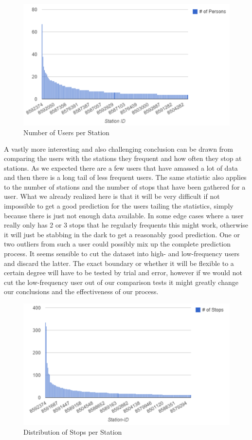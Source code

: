 \begin{figure}[!ht]
	\caption{Number of Users per Station}
	\centering
	\includegraphics[width=1.0\textwidth]{charts/persons_per_station}
\end{figure}

A vastly more interesting and also challenging conclusion can be drawn from comparing the users with the stations they frequent and how often they stop at stations. As we expected there are a few users that have amassed a lot of data and then there is a long tail of less frequent users. The same statistic also applies to the number of stations and the number of stops that have been gathered for a user. What we already realized here is that it will be very difficult if not impossible to get a good prediction for the users tailing the statistics, simply because there is just not enough data available. In some edge cases where a user really only has 2 or 3 stops that he regularly frequents this might work, otherwise it will just be stabbing in the dark to get a reasonably good prediction. One or two outliers from such a user could possibly mix up the complete prediction process. It seems sensible to cut the dataset into high- and low-frequency users and discard the latter. The exact boundary or whether it will be flexible to a certain degree will have to be tested by trial and error, however if we would not cut the low-frequency user out of our comparison tests it might greatly change our conclusions and the effectiveness of our process.

\begin{figure}[!ht]
	\caption{Distribution of Stops per Station}
	\centering
	\includegraphics[width=1.0\textwidth]{charts/distribution_stops_by_station}
\end{figure}

